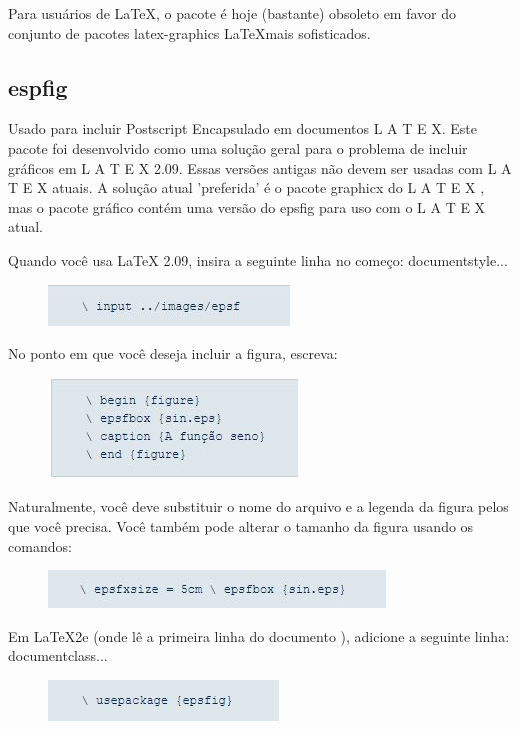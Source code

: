 \documentclass[12pt]{article}
\begin{document}
			Para usuários de \LaTeX, o pacote é hoje (bastante) obsoleto em favor do conjunto de pacotes latex-graphics \LaTeX mais sofisticados.
		
		\subsection{espfig}
			Usado para incluir Postscript Encapsulado em documentos L A T E X.
			Este pacote foi desenvolvido como uma solução geral para o problema de incluir gráficos em L A T E X 2.09. Essas versões antigas não devem ser usadas com L A T E X atuais.
			A solução atual 'preferida' é o pacote graphicx do L A T E X , mas o pacote gráfico contém uma versão do epsfig para uso com o L A T E X atual.
			
			Quando você usa LaTeX 2.09, insira a seguinte linha no começo: documentstyle... 
			\begin{figure}[!htb]
				\centering
				\includegraphics[scale=1.1]{9.JPG}
			\end{figure}
			
			No ponto em que você deseja incluir a figura, escreva:
			\begin{figure}[!htb]
				\centering
				\includegraphics[scale=1.1]{10.JPG}
			\end{figure}
			
			Naturalmente, você deve substituir o nome do arquivo e a legenda da figura pelos que você precisa. Você também pode alterar o tamanho da figura usando os comandos:
			\begin{figure}[!htb]
				\centering
				\includegraphics[scale=1.1]{11.JPG}
			\end{figure}
			
			Em LaTeX2e (onde lê a primeira linha do documento ), adicione a seguinte linha: documentclass...
			
			\begin{figure}[!htb]
				\centering
				\includegraphics[scale=1.1]{12.JPG}
			\end{figure}
			
\end{document}
